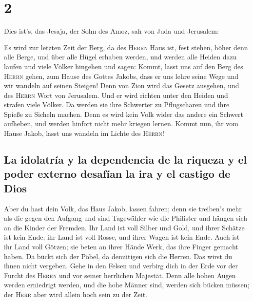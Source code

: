 \hypertarget{section-1}{%
\section{2}\label{section-1}}

 Dies ist's, das Jesaja, der Sohn des Amoz, sah von Juda
und Jerusalem:

 Es wird zur letzten Zeit der Berg, da des \textsc{Herrn}
Haus ist, fest stehen, höher denn alle Berge, und über alle Hügel
erhaben werden, und werden alle Heiden dazu laufen  und
viele Völker hingehen und sagen: Kommt, lasst uns auf den Berg des
\textsc{Herrn} gehen, zum Hause des Gottes Jakobs, dass er uns lehre
seine Wege und wir wandeln auf seinen Steigen! Denn von Zion wird das
Gesetz ausgehen, und des \textsc{Herrn} Wort von Jerusalem.
 Und er wird richten unter den Heiden und strafen viele
Völker. Da werden sie ihre Schwerter zu Pflugscharen und ihre Spieße zu
Sicheln machen. Denn es wird kein Volk wider das andere ein Schwert
aufheben, und werden hinfort nicht mehr kriegen lernen. 
Kommt nun, ihr vom Hause Jakob, lasst uns wandeln im Lichte des
\textsc{Herrn}!

\hypertarget{la-idolatruxeda-y-la-dependencia-de-la-riqueza-y-el-poder-externo-desafuxedan-la-ira-y-el-castigo-de-dios}{%
\subsection{La idolatría y la dependencia de la riqueza y el poder
externo desafían la ira y el castigo de
Dios}\label{la-idolatruxeda-y-la-dependencia-de-la-riqueza-y-el-poder-externo-desafuxedan-la-ira-y-el-castigo-de-dios}}

 Aber du hast dein Volk, das Haus Jakob, lassen fahren;
denn sie treiben's mehr als die gegen den Aufgang und sind Tagewähler
wie die Philister und hängen sich an die Kinder der Fremden.
 Ihr Land ist voll Silber und Gold, und ihrer Schätze ist
kein Ende; ihr Land ist voll Rosse, und ihrer Wagen ist kein Ende.
 Auch ist ihr Land voll Götzen; sie beten an ihrer Hände
Werk, das ihre Finger gemacht haben.  Da bückt sich der
Pöbel, da demütigen sich die Herren. Das wirst du ihnen nicht vergeben.
 Gehe in den Felsen und verbirg dich in der Erde vor der
Furcht des \textsc{Herrn} und vor seiner herrlichen Majestät.
 Denn alle hohen Augen werden erniedrigt werden, und die
hohe Männer sind, werden sich bücken müssen; der \textsc{Herr} aber wird
allein hoch sein zu der Zeit.


